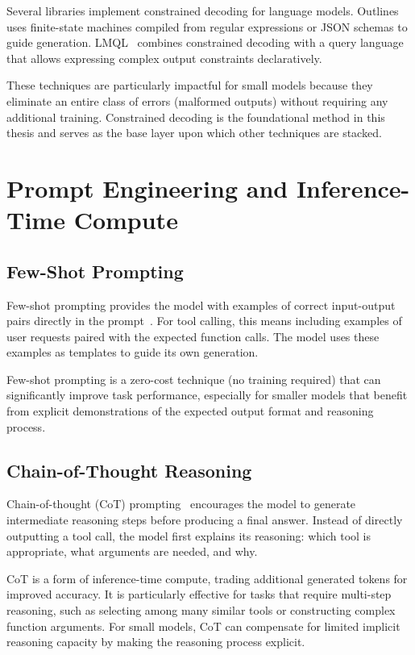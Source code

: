 Several libraries implement constrained decoding for language models. Outlines~\cite{outlines2024} uses finite-state machines compiled from regular expressions or JSON schemas to guide generation. LMQL~\cite{beurer2024guidance} combines constrained decoding with a query language that allows expressing complex output constraints declaratively.

These techniques are particularly impactful for small models because they eliminate an entire class of errors (malformed outputs) without requiring any additional training. Constrained decoding is the foundational method in this thesis and serves as the base layer upon which other techniques are stacked.

\section{Prompt Engineering and Inference-Time Compute}

\subsection{Few-Shot Prompting}

Few-shot prompting provides the model with examples of correct input-output pairs directly in the prompt~\cite{brown2020language}. For tool calling, this means including examples of user requests paired with the expected function calls. The model uses these examples as templates to guide its own generation.

Few-shot prompting is a zero-cost technique (no training required) that can significantly improve task performance, especially for smaller models that benefit from explicit demonstrations of the expected output format and reasoning process.

\subsection{Chain-of-Thought Reasoning}

Chain-of-thought (CoT) prompting~\cite{wei2022chain} encourages the model to generate intermediate reasoning steps before producing a final answer. Instead of directly outputting a tool call, the model first explains its reasoning: which tool is appropriate, what arguments are needed, and why.

CoT is a form of inference-time compute, trading additional generated tokens for improved accuracy. It is particularly effective for tasks that require multi-step reasoning, such as selecting among many similar tools or constructing complex function arguments. For small models, CoT can compensate for limited implicit reasoning capacity by making the reasoning process explicit.

